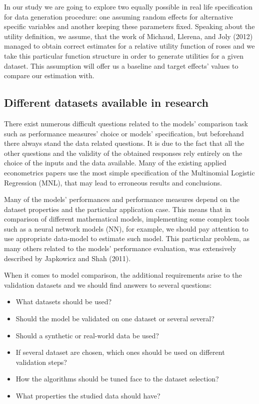 \documentclass[11pt,]{article}
\providecommand{\tightlist}{%
  \setlength{\itemsep}{0pt}\setlength{\parskip}{0pt}}
\begin{document}
In our study we are going to explore two equally possible in real life
specification for data generation procedure: one assuming random effects
for alternative specific variables and another keeping these parameters
fixed. Speaking about the utility definition, we assume, that the work
of Michaud, Llerena, and Joly (2012) managed to obtain correct estimates
for a relative utility function of roses and we take this particular
function structure in order to generate utilities for a given dataset.
This assumption will offer us a baseline and target effects' values to
compare our estimation with.

\hypertarget{different-datasets-available-in-research}{%
\subsection{Different datasets available in
research}\label{different-datasets-available-in-research}}

There exist numerous difficult questions related to the models'
comparison task such as performance measures' choice or models'
specification, but beforehand there always stand the data related
questions. It is due to the fact that all the other questions and the
validity of the obtained responses rely entirely on the choice of the
inputs and the data available. Many of the existing applied econometrics
papers use the most simple specification of the Multinomial Logistic
Regression (MNL), that may lead to erroneous results and conclusions.

Many of the models' performances and performance measures depend on the
dataset properties and the particular application case. This means that
in comparison of different mathematical models, implementing some
complex tools such as a neural network models (NN), for example, we
should pay attention to use appropriate data-model to estimate such
model. This particular problem, as many others related to the models'
performance evaluation, was extensively described by Japkowicz and Shah
(2011).

When it comes to model comparison, the additional requirements arise to
the validation datasets and we should find answers to several questions:

\begin{itemize}
\tightlist
\item
  What datasets should be used?
\item
  Should the model be validated on one dataset or several several?
\item
  Should a synthetic or real-world data be used?
\item
  If several dataset are chosen, which ones should be used on different
  validation steps?
\item
  How the algorithms should be tuned face to the dataset selection?
\item
  What properties the studied data should have?
\end{itemize}
\end{document}
